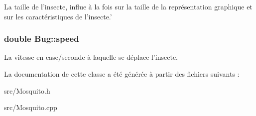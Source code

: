 \label{classBug_a27a0f0b84d15525e409955509e6e3c42}
La taille de l'insecte, influe à la fois sur la taille de la représentation graphique et sur les caractéristiques de l'insecte.' \hypertarget{classBug_a13b95fbf23748ea853b01bfd0b0e7fc8}{
\subsubsection[{speed}]{\setlength{\rightskip}{0pt plus 5cm}double {\bf Bug::speed}}}
\label{classBug_a13b95fbf23748ea853b01bfd0b0e7fc8}
La vitesse en case/seconde à laquelle se déplace l'insecte. 

La documentation de cette classe a été générée à partir des fichiers suivants :\begin{DoxyCompactItemize}
\item 
src/Mosquito.h\item 
src/Mosquito.cpp\end{DoxyCompactItemize}
